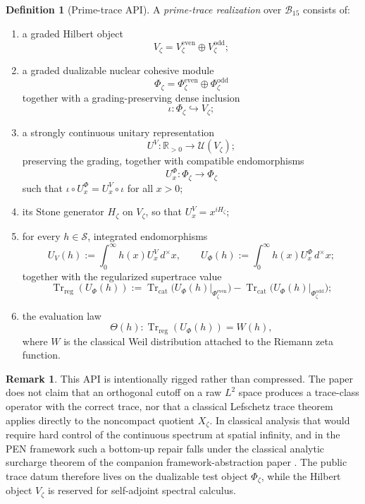 \documentclass[11pt,a4paper]{article}
\theoremstyle{plain}
\theoremstyle{definition}
\newtheorem{definition}[theorem]{Definition}
\newtheorem{remark}[theorem]{Remark}
\newcommand{\R}{\mathbb{R}}
\newcommand{\Bcal}{\mathcal{B}}
\newcommand{\Trreg}{\operatorname{Tr}_{\mathrm{reg}}}
\newcommand{\Trcat}{\operatorname{Tr}_{\mathrm{cat}}}
\newcommand{\dmu}{d^{\times}}
\begin{document}
\begin{definition}[Prime-trace API]
\label{def:api}
A \emph{prime-trace realization} over $\Bcal_{15}$ consists of:
\begin{enumerate}
  \item a graded Hilbert object
  \[
    V_{\zeta}=V_{\zeta}^{\mathrm{even}}\oplus V_{\zeta}^{\mathrm{odd}};
  \]
  \item a graded dualizable nuclear cohesive module
  \[
    \Phi_{\zeta}=\Phi_{\zeta}^{\mathrm{even}}\oplus \Phi_{\zeta}^{\mathrm{odd}}
  \]
  together with a grading-preserving dense inclusion
  \[
    \iota:\Phi_{\zeta}\hookrightarrow V_{\zeta};
  \]
  \item a strongly continuous unitary representation
  \[
    U^V:\R_{>0}\to \mathcal U(V_{\zeta});
  \]
  preserving the grading, together with compatible endomorphisms
  \[
    U^\Phi_x:\Phi_{\zeta}\to\Phi_{\zeta}
  \]
  such that $\iota\circ U^\Phi_x=U^V_x\circ \iota$ for all $x>0$;
  \item its Stone generator $H_{\zeta}$ on $V_{\zeta}$, so that $U^V_x=x^{iH_{\zeta}}$;
  \item for every $h\in\mathscr S$, integrated endomorphisms
  \[
    U_V(h):=\int_{0}^{\infty} h(x)U^V_x\,\dmu x,
    \qquad
    U_{\Phi}(h):=\int_{0}^{\infty} h(x)U^\Phi_x\,\dmu x;
  \]
  together with the regularized supertrace value
  \[
    \Trreg(U_{\Phi}(h))
    :=
    \Trcat\!\bigl(U_{\Phi}(h)\big|_{\Phi_{\zeta}^{\mathrm{even}}}\bigr)
    -
    \Trcat\!\bigl(U_{\Phi}(h)\big|_{\Phi_{\zeta}^{\mathrm{odd}}}\bigr);
  \]
  \item the evaluation law
  \[
    \Theta(h):\Trreg(U_{\Phi}(h))=W(h),
  \]
  where $W$ is the classical Weil distribution attached to the Riemann zeta function.
\end{enumerate}
\end{definition}

\begin{remark}
This API is intentionally rigged rather than compressed. The paper does not claim that an orthogonal cutoff on a raw $L^2$ space produces a trace-class operator with the correct trace, nor that a classical Lefschetz trace theorem applies directly to the noncompact quotient $X_{\zeta}$. In classical analysis that would require hard control of the continuous spectrum at spatial infinity, and in the PEN framework such a bottom-up repair falls under the classical analytic surcharge theorem of the companion framework-abstraction paper \citep[Theorem~2.1]{lande-framework}. The public trace datum therefore lives on the dualizable test object $\Phi_{\zeta}$, while the Hilbert object $V_{\zeta}$ is reserved for self-adjoint spectral calculus.
\end{remark}
\end{document}
